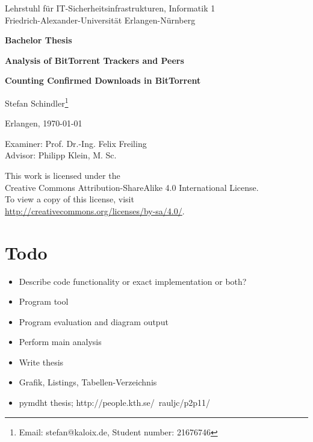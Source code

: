 \documentclass[10pt, a4paper]{scrartcl} %
\renewcommand{\_}{\origunderscore\allowbreak}
\begin{document}
\begin{titlepage}
\noindent
\begin{center}
\large{Lehrstuhl für IT-Sicherheitsinfrastrukturen, Informatik 1\\
Friedrich-Alexander-Universität Erlangen-Nürnberg}

\vspace{2cm}
\textbf{\Large{Bachelor Thesis}}

\vspace{1cm}
\textbf{\textsf{\huge{Analysis of BitTorrent Trackers and Peers}}}

\vspace{0.4cm}
\textbf{\textsf{\LARGE{Counting Confirmed Downloads in BitTorrent}}}

\vspace{1cm}
\Large{Stefan Schindler\footnote{Email: stefan@kaloix.de, Student number: 21676746}}

\vspace{1cm}
\Large{Erlangen, \today}

\vspace{6cm}
\large{Examiner: Prof. Dr.-Ing. Felix Freiling\\
Advisor: Philipp Klein, M. Sc.}

\vspace{2cm}
\large{This work is licensed under the\\
Creative Commons Attribution-ShareAlike 4.0 International License.\\
To view a copy of this license, visit\\
\url{http://creativecommons.org/licenses/by-sa/4.0/}.}
\end{center}
\end{titlepage}

\section*{Todo}
\begin{itemize}
  \item Describe code functionality or exact implementation or both?
\end{itemize}

\begin{itemize}
  \item Program tool
  \item Program evaluation and diagram output
  \item Perform main analysis
  \item Write thesis
  \item Grafik, Listings, Tabellen-Verzeichnis
  \item pymdht thesis; http://people.kth.se/~rauljc/p2p11/
\end{itemize}
\end{document}
